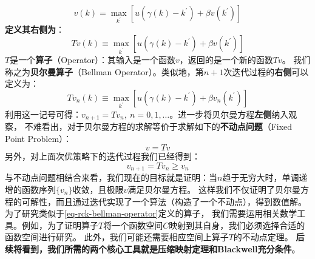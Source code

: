 \begin{equation*}
    v\left(k\right) = \max _{k^{\prime}}
        \left[u\left(\gamma\left(k\right)-k^{\prime}\right)+\beta v\left(k^{\prime}\right)\right]
\end{equation*}
\textbf{定义其右侧为}：
\begin{equation}    \label{eq-rck-bellman-operator}
    Tv\left(k\right) \equiv \max _{k^{\prime}} 
        \left[u\left(\gamma\left(k\right)-k^{\prime}\right)+\beta v\left(k^{\prime}\right)\right]
\end{equation}
$T$是一个\textbf{算子}（Operator）：其输入是一个函数$v$，返回的是一个新的函数$Tv$。
我们称之为\textbf{贝尔曼算子}（Bellman Operator）。类似地，第$n+1$次迭代过程的\textbf{右侧}可以定义为：
\begin{equation*}
    Tv_n\left(k\right) \equiv \max_{k^{\prime}}
        \left[u\left(\gamma\left(k\right)-k^{\prime}\right)+\beta v_n\left(k^{\prime}\right)\right]
\end{equation*}
利用这一记号可得：$v_{n+1}=Tv_n, ~ n=0,1,\dots$。进一步将贝尔曼方程\textbf{左侧}纳入观察，
不难看出，对于贝尔曼方程的求解等价于求解如下的\textbf{不动点问题}（Fixed Point Problem）：
\begin{equation*}
    v = Tv
\end{equation*}
另外，对上面次优策略下的迭代过程我们已经得到：
\begin{equation*}
    v_{n+1}=Tv_n \geq v_n
\end{equation*}
与不动点问题相结合来看，我们现在的目标就是证明：当$n$趋于无穷大时，单调递增的函数序列$\{v_n\}$收敛，且极限$v$满足贝尔曼方程。
这样我们不仅证明了贝尔曼方程的可解性，而且通过迭代实现了一个算法（构造了一个不动点），得到数值解。
为了研究类似于\cref{eq-rck-bellman-operator}定义的算子，
我们需要运用相关数学工具。例如，为了证明算子$T$将一个函数空间$C$映射到其自身，我们必须选择合适的函数空间进行研究。
此外，我们可能还需要相应空间上算子$T$的不动点定理。
\textbf{后续将看到，我们所需的两个核心工具就是压缩映射定理和Blackwell充分条件}。